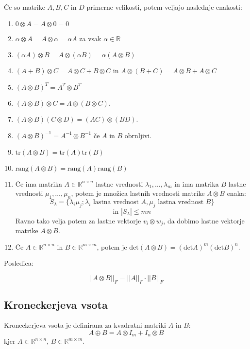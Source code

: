 \documentclass{article}
\begin{document}
\begin{multicols}{2}
	Če so matrike $A, B, C$ in $D$ primerne velikosti, potem veljajo naslednje enakosti:
	\begin{enumerate}
		\item $0 \otimes A = A \otimes 0 = 0$
		\item $\alpha \otimes A = A \otimes \alpha = \alpha A$ za vsak $\alpha \in \mathbb{R}$
		\item $(\alpha A) \otimes B = A \otimes (\alpha B) = \alpha (A \otimes B)$
		\item $(A + B) \otimes C = A \otimes C + B \otimes C$ in $A \otimes (B + C) = A \otimes B + A \otimes C$
		\item $(A \otimes B)^T = A^T \otimes B^T$
		\item $(A \otimes B) \otimes C = A \otimes (B \otimes C)$.
		\item $(A \otimes B)(C \otimes D) = (AC) \otimes (BD)$.
		\item $(A \otimes B)^{-1} = A^{-1} \otimes B^{-1}$ če $A$ in $B$ obrnljivi.
		\item $\text{tr}(A \otimes B) = \text{tr}(A) \text{tr}(B)$
		\item $\text{rang}(A \otimes B) = \text{rang}(A) \text{rang}(B)$
		\item Če ima matrika $A \in \mathbb{R}^{n \times n}$ lastne vrednosti $\lambda_1, \ldots, \lambda_m$ in ima matrika $B$ lastne vrednosti $\mu_1, \ldots, \mu_n$, potem je množica lastnih vrednosti matrike $A \otimes B$ enaka:
		      $$ S_\lambda  = \{ \lambda_i \mu_j; \lambda_i \text{ lastna vrednost } A, \mu_j \text{ lastna vrednost } B\} $$
		      $$\text{in } |S_\lambda| \leq mn$$
		      Ravno tako velja potem za lastne vektorje $ v_i \otimes w_j$, da dobimo lastne vektorje matrike $A \otimes B$.
		\item Če $A \in \mathbb{R}^{n \times n}$ in $B \in \mathbb{R}^{m \times m}$, potem je $\text{det}(A \otimes B) = (\text{det} A)^m(\text{det} B)^n.$
	\end{enumerate}

	Posledica:

	\[
		||A \otimes B||_F = ||A||_F \cdot ||B||_F
	\]

	\subsection{Kroneckerjeva vsota}

	Kroneckerjeva vsota je definirana za kvadratni matriki \( A \) in \( B \):
	\[ A \oplus B = A \otimes I_m + I_n \otimes B \]
	kjer \( A \in \mathbb{R}^{n \times n} \), \( B \in \mathbb{R}^{m \times m} \).


\end{multicols}
\end{document}
